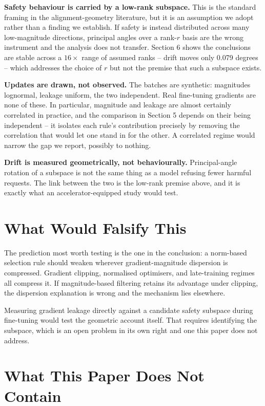 \documentclass[10pt,journal,compsoc,twocolumn]{IEEEtran}
\begin{document}
\textbf{Safety behaviour is carried by a low-rank subspace.} This is the standard framing in the alignment-geometry literature, but it is an assumption we adopt rather than a finding we establish. If safety is instead distributed across many low-magnitude directions, principal angles over a rank-$r$ basis are the wrong instrument and the analysis does not transfer. Section 6 shows the conclusions are stable across a $16\times$ range of assumed ranks -- drift moves only 0.079 degrees -- which addresses the choice of $r$ but not the premise that such a subspace exists.

\textbf{Updates are drawn, not observed.} The batches are synthetic: magnitudes lognormal, leakage uniform, the two independent. Real fine-tuning gradients are none of these. In particular, magnitude and leakage are almost certainly correlated in practice, and the comparison in Section 5 depends on their being independent -- it isolates each rule's contribution precisely by removing the correlation that would let one stand in for the other. A correlated regime would narrow the gap we report, possibly to nothing.

\textbf{Drift is measured geometrically, not behaviourally.} Principal-angle rotation of a subspace is not the same thing as a model refusing fewer harmful requests. The link between the two is the low-rank premise above, and it is exactly what an accelerator-equipped study would test.


\section{What Would Falsify This}


The prediction most worth testing is the one in the conclusion: a norm-based selection rule should weaken wherever gradient-magnitude dispersion is compressed. Gradient clipping, normalised optimisers, and late-training regimes all compress it. If magnitude-based filtering retains its advantage under clipping, the dispersion explanation is wrong and the mechanism lies elsewhere.

Measuring gradient leakage directly against a candidate safety subspace during fine-tuning would test the geometric account itself. That requires identifying the subspace, which is an open problem in its own right and one this paper does not address.


\section{What This Paper Does Not Contain}
\end{document}
